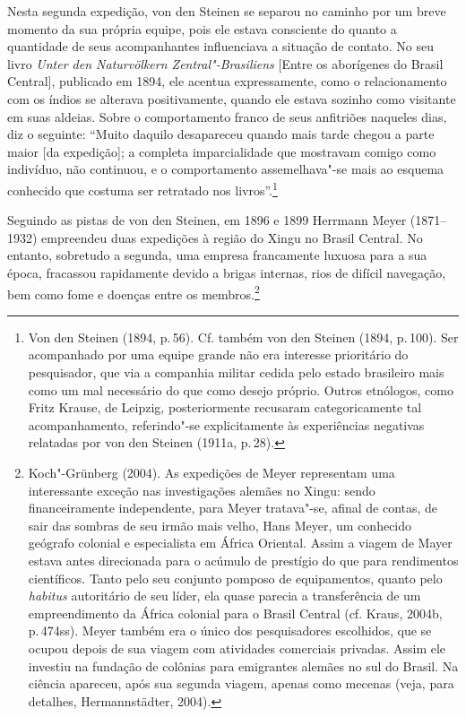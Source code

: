 Nesta segunda expedição, von den Steinen se separou no caminho por um
breve momento da sua própria equipe, pois ele estava consciente do
quanto a quantidade de seus acompanhantes influenciava a situação de
contato. No seu livro \textit{Unter den Naturvölkern Zentral"-Brasiliens}
{[}Entre os aborígenes do Brasil Central{]}, publicado em 1894, ele
acentua expressamente, como o relacionamento com os índios se alterava
positivamente, quando ele estava sozinho como visitante em suas aldeias.
Sobre o comportamento franco de seus anfitriões naqueles dias, diz o
seguinte: ``Muito daquilo desapareceu quando mais tarde chegou a parte
maior {[}da expedição{]}; a completa imparcialidade que mostravam
comigo como indivíduo, não continuou, e o comportamento assemelhava"-se
mais ao esquema conhecido que costuma ser retratado nos
livros''.\footnote{Von den Steinen (1894, p.\,56). Cf. também von den
  Steinen (1894, p.\,100). Ser acompanhado por uma equipe grande não era
  interesse prioritário do pesquisador, que via a companhia militar
  cedida pelo estado brasileiro mais como um mal necessário do que como
  desejo próprio. Outros etnólogos, como Fritz Krause, de Leipzig,
  posteriormente recusaram categoricamente tal acompanhamento,
  referindo"-se explicitamente às experiências negativas relatadas por
  von den Steinen (1911a, p.\,28).}

Seguindo as pistas de von den Steinen, em 1896 e 1899 Herrmann Meyer
(1871--1932) empreendeu duas expedições à região do Xingu no Brasil
Central. No entanto, sobretudo a segunda, uma empresa francamente
luxuosa para a sua época, fracassou rapidamente devido a brigas
internas, rios de difícil navegação, bem como fome e doenças entre os
membros.\footnote{Koch"-Grünberg (2004). As expedições de Meyer
  representam uma interessante exceção nas investigações alemães no
  Xingu: sendo financeiramente independente, para Meyer tratava"-se,
  afinal de contas, de sair das sombras de seu irmão mais velho, Hans
  Meyer, um conhecido geógrafo colonial e especialista em África
  Oriental. Assim a viagem de Mayer estava antes direcionada para o
  acúmulo de prestígio do que para rendimentos científicos. Tanto pelo
  seu conjunto pomposo de equipamentos, quanto pelo \textit{habitus}
  autoritário de seu líder, ela quase parecia a transferência de um
  empreendimento da África colonial para o Brasil Central (cf. Kraus,
  2004b, p.\,474ss). Meyer também era o único dos pesquisadores
  escolhidos, que se ocupou depois de sua viagem com atividades
  comerciais privadas. Assim ele investiu na fundação de colônias para
  emigrantes alemães no sul do Brasil. Na ciência apareceu, após sua
  segunda viagem, apenas como mecenas (veja, para detalhes,
  Hermannstädter, 2004).}


